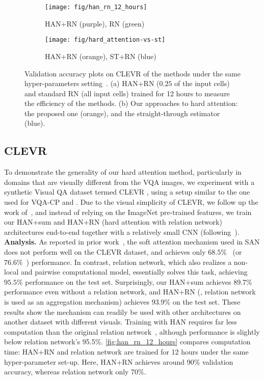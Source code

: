 \begin{figure}[!htb]
\begin{center}
\begin{subfigure}{.5\textwidth}
  \centering
  \texttt{[image: fig/han\_rn\_12\_hours]}
  \caption{HAN+RN (purple), RN (green)}
  \label{fig:han_rn_12_hours}
\end{subfigure}\begin{subfigure}{.5\textwidth}
  \centering
  \texttt{[image: fig/hard\_attention-vs-st]}
  \caption{HAN+RN (orange), ST+RN (blue)}
  \label{fig:han_vs_st}
\end{subfigure}\end{center}
\caption{Validation accuracy plots on CLEVR of the methods under the same hyper-parameters setting~\cite{santoro2017simple}. (a)  HAN+RN ($0.25$ of the input cells)  and standard RN (all input cells) trained for 12 hours to measure the efficiency of the methods. (b) Our approaches to hard attention: the proposed one (orange), and the straight-through estimator (blue). }
\end{figure}



\subsection{CLEVR}
To demonstrate the generality of our hard attention method, particularly in domains that are visually different from the VQA images, 
we experiment with a synthetic Visual QA dataset termed CLEVR \cite{johnson2017clevr}, using a setup similar to the one used for VQA-CP and \cite{santoro2017simple}.  
Due to the visual simplicity of CLEVR, we follow up the work of~\cite{santoro2017simple}, and instead of relying on the ImageNet pre-trained features, we train our HAN+sum and HAN+RN (hard attention with relation network) architectures end-to-end together with a relatively small CNN (following~\cite{santoro2017simple}).
\newline
\noindent \textbf{Analysis.}
As reported in prior work~\cite{santoro2017simple,johnson2017clevr}, the soft attention mechanism used in SAN does not perform well on the CLEVR dataset, and achieves only $68.5\%$~\cite{johnson2017clevr} (or $76.6\%$~\cite{santoro2017simple}) performance. In contrast, relation network, which also realizes a non-local and pairwise computational model, essentially solves this task, achieving $95.5\%$ performance on the test set.
Surprisingly, our HAN+sum achieves 
89.7\%
performance even without a relation network, and HAN+RN (\ie, relation network is used as an aggregation mechanism) achieves 
$93.9\%$ on the test set.
These results show the mechanism can readily be used with other architectures on another dataset with different visuals. Training with HAN requires far less computation than the original relation network~\cite{santoro2017simple}, although performance is slightly below relation network's 95.5\%. \autoref{fig:han_rn_12_hours} compares computation time: HAN+RN and relation network are trained for 12 hours under the same hyper-parameter set-up. Here, HAN+RN achieves around 90\% validation accuracy, whereas relation network only 70\%.


